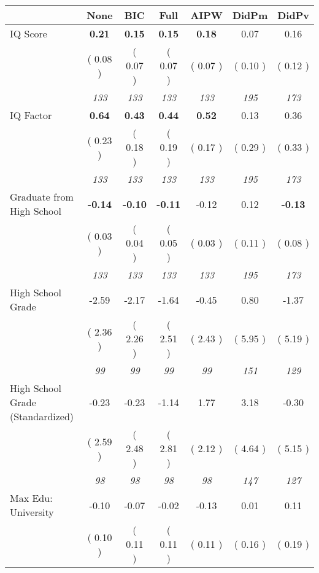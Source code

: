 \begin{tabular}{l c c c c c c}
\toprule
 & None & BIC & Full & AIPW & DidPm & DidPv \\
\midrule
IQ Score & \textbf{      0.21 } & \textbf{      0.15 } & \textbf{      0.15 } & \textbf{     0.18} &      0.07 &      0.16 \\
& (     0.08 ) & (     0.07 ) & (     0.07 ) & (     0.07 ) & (     0.10 ) & (     0.12 ) \\
& \textit{ 133 } & \textit{ 133 } & \textit{ 133 } & \textit{ 133 } & \textit{ 195 } & \textit{ 173 } \\
IQ Factor & \textbf{      0.64 } & \textbf{      0.43 } & \textbf{      0.44 } & \textbf{     0.52} &      0.13 &      0.36 \\
& (     0.23 ) & (     0.18 ) & (     0.19 ) & (     0.17 ) & (     0.29 ) & (     0.33 ) \\
& \textit{ 133 } & \textit{ 133 } & \textit{ 133 } & \textit{ 133 } & \textit{ 195 } & \textit{ 173 } \\
Graduate from High School & \textbf{     -0.14 } & \textbf{     -0.10 } & \textbf{     -0.11 } &     -0.12 &      0.12 & \textbf{     -0.13 } \\
& (     0.03 ) & (     0.04 ) & (     0.05 ) & (     0.03 ) & (     0.11 ) & (     0.08 ) \\
& \textit{ 133 } & \textit{ 133 } & \textit{ 133 } & \textit{ 133 } & \textit{ 195 } & \textit{ 173 } \\
High School Grade &     -2.59 &     -2.17 &     -1.64 &     -0.45 &      0.80 &     -1.37 \\
& (     2.36 ) & (     2.26 ) & (     2.51 ) & (     2.43 ) & (     5.95 ) & (     5.19 ) \\
& \textit{ 99 } & \textit{ 99 } & \textit{ 99 } & \textit{ 99 } & \textit{ 151 } & \textit{ 129 } \\
High School Grade (Standardized) &     -0.23 &     -0.23 &     -1.14 &      1.77 &      3.18 &     -0.30 \\
& (     2.59 ) & (     2.48 ) & (     2.81 ) & (     2.12 ) & (     4.64 ) & (     5.15 ) \\
& \textit{ 98 } & \textit{ 98 } & \textit{ 98 } & \textit{ 98 } & \textit{ 147 } & \textit{ 127 } \\
Max Edu: University &     -0.10 &     -0.07 &     -0.02 &     -0.13 &      0.01 &      0.11 \\
& (     0.10 ) & (     0.11 ) & (     0.11 ) & (     0.11 ) & (     0.16 ) & (     0.19 ) \\

\end{tabular}
